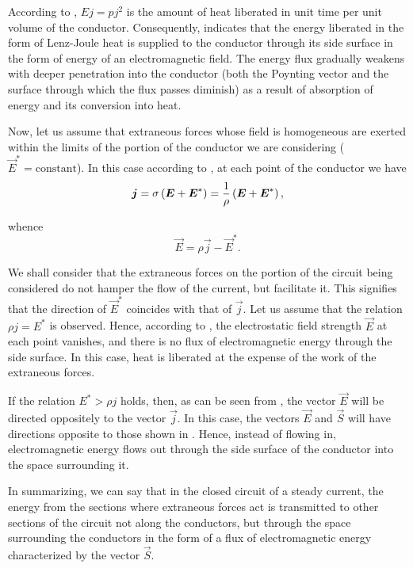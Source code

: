 According to , $Ej = pj^2$ is the amount of heat liberated in unit time per unit volume of the conductor.
Consequently,  indicates that the energy liberated in the form of Lenz-Joule heat is supplied to the conductor through its side surface in the form of energy of an electromagnetic field.
The energy flux gradually weakens with deeper penetration into the conductor (both the Poynting vector and the surface through which the flux passes diminish) as a result of absorption of energy and its conversion into heat.

Now, let us assume that extraneous forces whose field is homogeneous are exerted within the limits of the portion of the conductor we are considering ($\vec{E}^*=\text{constant}$).
In this case according to , at each point of the conductor we have
\begin{equation*}
    \boldsymbol{j} = \sigma \left(\boldsymbol{E} + \boldsymbol{E}^*\right) = \frac{1}{\rho} \left(\boldsymbol{E} + \boldsymbol{E}^*\right),
\end{equation*}

\noindent
whence
\begin{equation}\label{eq:15_32}
    \vec{E} = \rho \vec{j} - \vec{E}^*.
\end{equation}

\noindent
We shall consider that the extraneous forces on the portion of the circuit being considered do not hamper the flow of the current, but facilitate it.
This signifies that the direction of $\vec{E}^*$ coincides with that of $\vec{j}$.
Let us assume that the relation $\rho j = E^*$ is observed.
Hence, according to , the electrostatic field strength $\vec{E}$ at each point vanishes, and there is no flux of electromagnetic energy through the side surface.
In this case, heat is liberated at the expense of the work of the extraneous forces.

If the relation $E^*>\rho j$ holds, then, as can be seen from , the vector $\vec{E}$ will be directed oppositely to the vector $\vec{j}$.
In this case, the vectors $\vec{E}$ and $\vec{S}$ will have directions opposite to those shown in .
Hence, instead of flowing in, electromagnetic energy
flows out through the side surface of the conductor into the space surrounding it.

In summarizing, we can say that in the closed circuit of a steady current, the energy from the sections where extraneous forces act is transmitted to other sections of the circuit not along the conductors, but through the space surrounding the conductors in the form of a flux of electromagnetic energy characterized by the vector $\vec{S}$.


